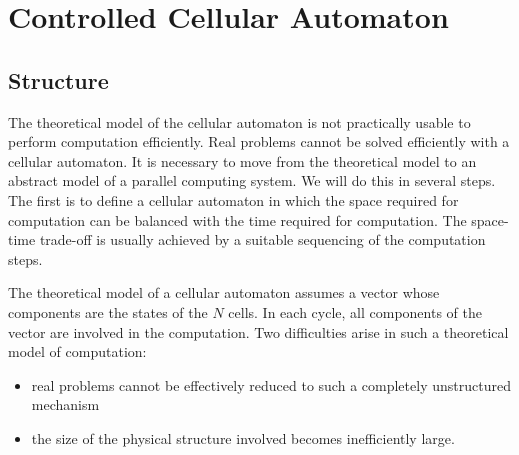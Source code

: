\section{Controlled Cellular Automaton}

\subsection{Structure}

The theoretical model of the cellular automaton is not practically usable to perform computation efficiently. Real problems cannot be solved efficiently with a cellular automaton. It is necessary to move from the theoretical model to an abstract model of a parallel computing system. We will do this in several steps. The first is to define a cellular automaton in which the space required for computation can be balanced with the time required for computation. The space-time trade-off is usually achieved by a suitable sequencing of the computation steps.

The theoretical model of a cellular automaton assumes a vector whose components are the states of the $N$ cells. In each cycle, all components of the vector are involved in the computation. Two difficulties arise in such a theoretical model of computation:
\begin{itemize}
    \item real problems cannot be effectively reduced to such a completely unstructured mechanism
    \item the size of the physical structure involved becomes inefficiently large.
\end{itemize}


